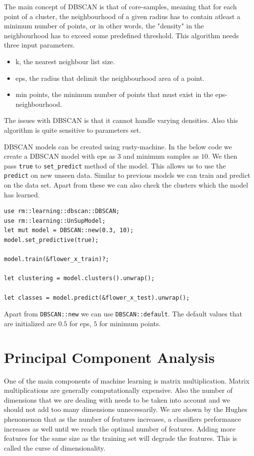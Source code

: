 \documentclass{book}
\begin{document}
The main concept of DBSCAN is that of core-samples, meaning that for each point of a cluster, the neighbourhood of a given radius has to contain atleast a minimum number of points, or in other words, the "density" in the neighbourhood has to exceed some predefined threshold. This algorithm needs three input parameters\cite{UL:9}.

\begin{itemize}
	\item k, the nearest neighbour list size.
	\item eps, the radius that delimit the neighbourhood area of a point.
	\item min points, the minimum number of points that must exist in the eps-neighbourhood.
\end{itemize}

The issues with DBSCAN is that it cannot handle varying densities. Also this algorithm is quite sensitive to parameters set.

DBSCAN models can be created using rusty-machine. In the below code we create a DBSCAN model with eps as $3$ and minimum samples as $10$. We then pass \lstinline{true} to \lstinline{set_predict} method of the model. This allows us to use the \lstinline{predict} on new unseen data. Similar to previous models we can train and predict on the data set. Apart from these we can also check the clusters which the model has learned.

\begin{lstlisting}[caption={rusty\_machine\_unsupervised},basicstyle=\small]
use rm::learning::dbscan::DBSCAN;
use rm::learning::UnSupModel;
let mut model = DBSCAN::new(0.3, 10);
model.set_predictive(true);

model.train(&flower_x_train)?;

let clustering = model.clusters().unwrap();

let classes = model.predict(&flower_x_test).unwrap();
\end{lstlisting}

Apart from \lstinline{DBSCAN::new} we can use \lstinline{DBSCAN::default}. The default values that are initialized are $0.5$ for eps, $5$ for minimum points.

\label{sec:dbscan}

\section{Principal Component Analysis}%
One of the main components of machine learning is matrix multiplication. Matrix multiplications are generally computationally expensive\cite{UL:4}. Also the number of dimensions that we are dealing with needs to be taken into account and we should not add too many dimensions unnecessarily. We are shown by the Hughes phenomenon that as the number of features increases, a classifiers performance increases as well until we reach the optimal number of features. Adding more features for the same size as the training set will degrade the features. This is called the curse of dimensionality\cite{UL:5}.
\end{document}
